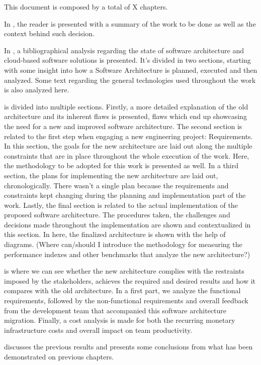 This document is composed by a total of X chapters.

In , the reader is presented with a summary of the work to be done as well as the context behind such decision.

In , a bibliographical analysis regarding the state of software architecture and cloud-based software solutions is presented. It’s divided in two sections, starting with some insight into how a Software Architecture is planned, executed and then analyzed. Some text regarding the general technologies used throughout the work is also analyzed here.

 is divided into multiple sections. Firstly, a more detailed explanation of the old architecture and its inherent flaws is presented, flaws which end up showcasing the need for a new and improved software architecture. The second section is related to the first step when engaging a new engineering project: Requirements. In this section, the goals for the new architecture are laid out along the multiple constraints that are in place throughout the whole execution of the work. Here, the methodology to be adopted for this work is presented as well. In a third section, the plans for implementing the new architecture are laid out, chronologically. There wasn’t a single plan because the requirements and constraints kept changing during the planning and implementation part of the work. Lastly, the final section is related to the actual implementation of the proposed software architecture. The procedures taken, the challenges and decisions made throughout the implementation are shown and contextualized in this section. In here, the finalized architecture is shown with the help of diagrams. (Where can/should I introduce the methodology for measuring the performance indexes and other benchmarks that analyze the new architecture?)

 is where we can see whether the new architecture complies with the restraints imposed by the stakeholders, achieves the required and desired results and how it compares with the old architecture. In a first part, we analyze the functional requirements, followed by the non-functional requirements and overall feedback from the development team that accompanied this software architecture migration. Finally, a cost analysis is made for both the recurring monetary infrastructure costs and overall impact on team productivity.

 discusses the previous results and presents some conclusions from what has been demonstrated on previous chapters.

